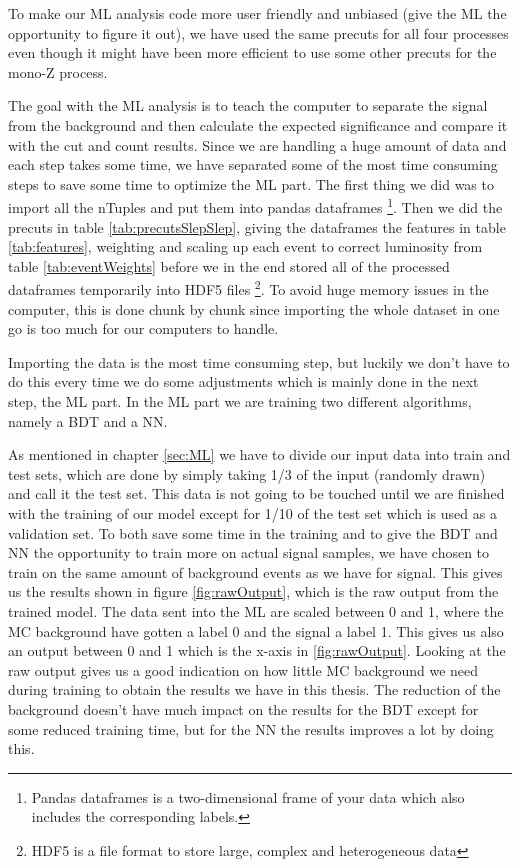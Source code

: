 \restoregeometry

To make our ML analysis code more user friendly and unbiased (give the ML the opportunity to figure it out), we have used the same precuts for all four processes even though it might have been more efficient to use some other precuts for the mono-Z process.

The goal with the ML analysis is to teach the computer to separate the signal from the background and then calculate the expected significance and compare it with the cut and count results. Since we are handling a huge amount of data and each step takes some time, we have separated some of the most time consuming steps to save some time to optimize the ML part. The first thing we did was to import all the nTuples and put them into pandas dataframes \footnote{Pandas dataframes \cite{PD} is a two-dimensional frame of your data which also includes the corresponding labels.}. Then we did the precuts in table \ref{tab:precutsSlepSlep}, giving the dataframes the features in table \ref{tab:features}, weighting and scaling up each event to correct luminosity from table \ref{tab:eventWeights} before we in the end stored all of the processed dataframes temporarily into HDF5 files \footnote{HDF5 \cite{hdf5} is a file format to store large, complex and heterogeneous data}. To avoid huge memory issues in the computer, this is done chunk by chunk since importing the whole dataset in one go is too much for our computers to handle. 

Importing the data is the most time consuming step, but luckily we don't have to do this every time we do some adjustments which is mainly done in the next step, the ML part. In the ML part we are training two different algorithms, namely a BDT and a NN. 

As mentioned in chapter \ref{sec:ML} we have to divide our input data into train and test sets, which are done by simply taking 1/3 of the input (randomly drawn) and call it the test set. This data is not going to be touched until we are finished with the training of our model except for 1/10 of the test set which is used as a validation set. To both save some time in the training and to give the BDT and NN the opportunity to train more on actual signal samples, we have chosen to train on the same amount of background events as we have for signal. This gives us the results shown in figure \ref{fig:rawOutput}, which is the raw output from the trained model. The data sent into the ML are scaled between 0 and 1, where the MC background have gotten a label 0 and the signal a label 1. This gives us also an output between 0 and 1 which is the x-axis in \ref{fig:rawOutput}. Looking at the raw output gives us a good indication on how little MC background we need during training to obtain the results we have in this thesis. The reduction of the background doesn't have much impact on the results for the BDT except for some reduced training time, but for the NN the results improves a lot by doing this. 


